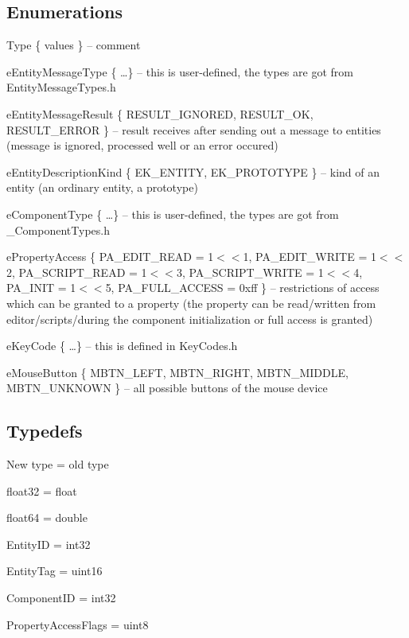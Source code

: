 \subsection{Enumerations}

\begin{titled-itemize}{Type \{ values \} -- comment}
  \item eEntityMessageType \{ \ldots \} -- this is user-defined, the types are got from EntityMessageTypes.h
  \item eEntityMessageResult \{ RESULT\_IGNORED, RESULT\_OK, RE\-SULT\-\_\-ER\-ROR \} -- result receives after sending out a message to entities (message is ignored, processed well or an error occured)
  \item eEntityDescriptionKind \{ EK\_ENTITY, EK\_PROTOTYPE \} -- kind of an entity (an ordinary entity, a prototype)
  \item eComponentType \{ \ldots \} -- this is user-defined, the types are got from \_ComponentTypes.h 
  \item ePropertyAccess \{ PA\_EDIT\_READ = 1$<<$1, PA\_EDIT\_WRITE = 1$<<$2, PA\_SCRIPT\_READ = 1$<<$3, PA\_SCRIPT\_WRITE = 1$<<$4, PA\_INIT = 1$<<$5, PA\_FULL\_ACCESS = 0xff \} -- restrictions of access which can be granted to a property (the property can be read/written from editor/scripts/during the component initialization or full access is granted)
  \item eKeyCode \{ \ldots \} -- this is defined in KeyCodes.h
  \item eMouseButton \{ MBTN\_LEFT, MBTN\_RIGHT, MBTN\_MIDDLE, \\MBTN\_UNKNOWN \} -- all possible buttons of the mouse device
\end{titled-itemize}

\subsection{Typedefs}

\begin{titled-itemize}{New type = old type}
  \item float32 = float
  \item float64 = double
  \item EntityID = int32
  \item EntityTag = uint16
  \item ComponentID = int32
  \item PropertyAccessFlags = uint8
\end{titled-itemize}


